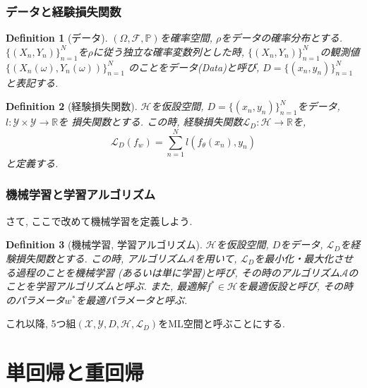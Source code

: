\documentclass[dvipdfmx,11pt]{beamer}		%
\newtheorem{defi}{Definition}
\newcommand{\R}{\mathbb{R}}
\newcommand{\X}{\mathcal{X}}
\newcommand{\Y}{\mathcal{Y}}
\newcommand{\Hil}{\mathcal{H}}
\newcommand{\Loss}{\mathcal{L}_{D}}
\begin{document}
    \begin{frame}
        \frametitle{データと経験損失関数}
        \begin{defi}[データ]
            $(\Omega, \mathcal{F}, \mathbb{P})$を確率空間, $\rho$をデータの確率分布とする.
            $\{(X_n, Y_n)\}_{n = 1}^{N}$を$\rho$に従う独立な確率変数列とした時, $\{(X_n, Y_n)\}_{n = 1}^{N}$の観測値$\{(X_n(\omega), Y_n(\omega))\}_{n = 1}^{N}$
            のことをデータ(Data)と呼び, $D = \{(x_n, y_n)\}_{n = 1}^{N}$と表記する.
        \end{defi}
        \begin{defi}[経験損失関数]
            $\Hil$を仮設空間, $D = \{(x_n, y_n)\}_{n = 1}^{N}$をデータ, $l:\Y\times\Y\to\R$を
            損失関数とする. この時, 経験損失関数$\Loss:\Hil\to\R$を,
            \begin{equation*}
                \Loss(f_{w}) = \sum_{n = 1}^{N}l(f_{\theta}(x_n), y_n)
            \end{equation*}
            と定義する. 
        \end{defi}
    \end{frame}
    \begin{frame}
        \frametitle{機械学習と学習アルゴリズム}
        さて, ここで改めて機械学習を定義しよう.
        \begin{defi}[機械学習, 学習アルゴリズム]
            $\Hil$を仮設空間, $D$をデータ, $\Loss$を経験損失関数とする. この時, 
            アルゴリズム$\mathcal{A}$を用いて, $\Loss$を最小化・最大化させる過程のことを機械学習
            (あるいは単に学習)と呼び, その時のアルゴリズム$\mathcal{A}$のことを学習アルゴリズムと呼ぶ. 
            また, 最適解$f^{*}\in\Hil$を最適仮設と呼び, その時のパラメータ$w^{*}$を最適パラメータと呼ぶ. 
        \end{defi}
        これ以降, 5つ組$(\X, \Y, D, \Hil, \Loss)$をML空間と呼ぶことにする. 
    \end{frame}
    \section{単回帰と重回帰}
\end{document}
